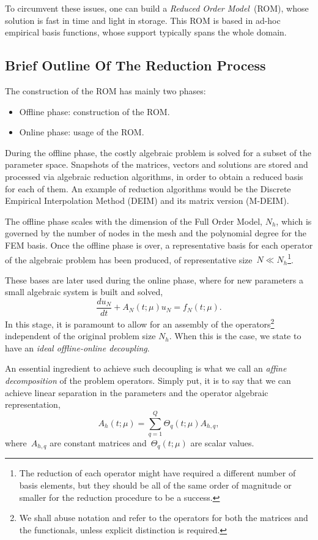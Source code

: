 \documentclass[a4paper, technote, compsoc]{IEEEtran}
\begin{document}
To circumvent these issues, one can build a \textit{Reduced Order Model}~(ROM), whose solution is fast in time and light in storage.
This ROM is based in ad-hoc empirical basis functions, whose support typically spans the whole domain. 

\subsection{Brief Outline Of The Reduction Process}
The construction of the ROM has mainly two phases:
\begin{itemize}
   \item Offline phase: construction of the ROM.
   \item Online phase: usage of the ROM.
\end{itemize}

During the offline phase, the costly algebraic problem is solved for a subset of the parameter space.
Snapshots of the matrices, vectors and solutions are stored and processed via algebraic reduction algorithms, in order to obtain a reduced basis for each of them.
An example of reduction algorithms would be the Discrete Empirical Interpolation Method (DEIM) and its matrix version (M-DEIM).

The offline phase scales with the dimension of the Full Order Model, $N_h$, which is governed by the number of nodes in the mesh and the polynomial degree for the FEM basis.
Once the offline phase is over, a representative basis for each operator of the algebraic problem has been produced, of representative size~$N \ll N_h$\footnote{The reduction of each operator might have required a different number of basis elements, but they should be all of the same order of magnitude or smaller for the reduction procedure to be a success.}.

These bases are later used during the online phase, where for new parameters a small algebraic system is built and solved,
\begin{equation*}
   \frac{du_N}{dt} + A_N\left(t;\mu\right) u_N = f_N\left(t;\mu\right).
\end{equation*}
In this stage, it is paramount to allow for an assembly of the operators\footnote{
   We shall abuse notation and refer to the operators for both the matrices and the functionals, unless explicit distinction is required.
} 
independent of the original problem size $N_h$.
When this is the case, we state to have an \textit{
   ideal offline-online decoupling}.

An essential ingredient to achieve such decoupling is what we call an \textit{
   affine decomposition} 
of the problem operators.
Simply put, it is to say that we can achieve linear separation in the parameters and the operator algebraic representation, 
\begin{equation*}
   A_h\left(t;\mu\right) = \sum_{q=1}^{Q} \Theta_{q}(t;\mu) A_{h,q},
\end{equation*}
where~$A_{h,q}$ are constant matrices and~$\Theta_{q}(t;\mu)$ are scalar values. 
\end{document}

